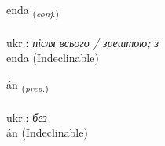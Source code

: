 \documentclass[frontgrid, backgrid]{flacards}\usepackage[]{graphicx}\usepackage[]{xcolor}
\begin{document}
\renewcommand{\flhead}{\vskip5pt \fboxsep=0pt {\small\bfseries\footnotesize Samtenging | сполучник}}
\renewcommand{\fcfoot}{\vskip5pt \fboxsep=0pt \hspace{2pt}{\small\bfseries\footnotesize 1K}}

\renewcommand{\blhead}{\vskip5pt {\small\bfseries\footnotesize Samtenging | сполучник }}
\renewcommand{\bcfoot}{\vskip5pt \hspace{2pt}{\small\bfseries\footnotesize 1K}}


{enda \small{\textsubscript{(\textit{conj.})}} \\[1ex]
\textphonetic{[ɛnta]} \\
ukr.: \emph{після всього / зрештою; з} \\  [2ex]
enda (Indeclinable)}


\renewcommand{\flhead}{\vskip5pt \fboxsep=0pt {\small\bfseries\footnotesize Forsetning | прийменник}}
\renewcommand{\fcfoot}{\vskip5pt \fboxsep=0pt \hspace{2pt}{\small\bfseries\footnotesize 1K}}

\renewcommand{\blhead}{\vskip5pt {\small\bfseries\footnotesize Forsetning | прийменник }}
\renewcommand{\bcfoot}{\vskip5pt \hspace{2pt}{\small\bfseries\footnotesize 1K}}


{án \small{\textsubscript{(\textit{prep.})}} \\[1ex]
\textphonetic{[auːn]} \\
ukr.: \emph{без} \\  [2ex]
án (Indeclinable)}

\renewcommand{\flhead}{\vskip5pt \fboxsep=0pt {\small\bfseries\footnotesize Sagnorð | дієслово}}
\renewcommand{\fcfoot}{\vskip5pt \fboxsep=0pt \hspace{2pt}{\small\bfseries\footnotesize 1K}}

\renewcommand{\blhead}{\vskip5pt {\small\bfseries\footnotesize Sagnorð | дієслово }}
\renewcommand{\bcfoot}{\vskip5pt \hspace{2pt}{\small\bfseries\footnotesize 1K}}
\end{document}
